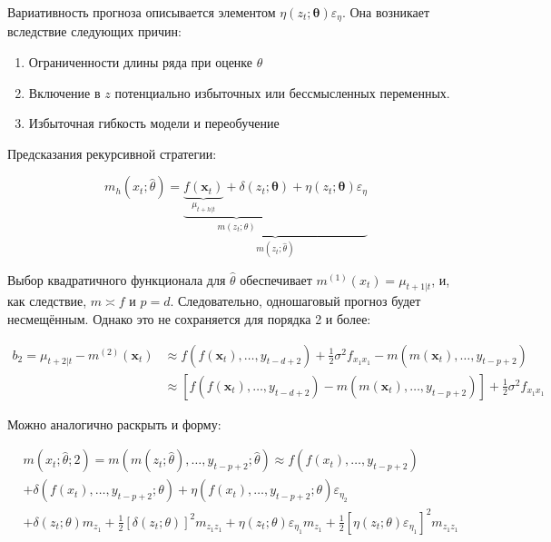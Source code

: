 \documentclass[a4paper,12pt]{article}
\begin{document}
Вариативность прогноза описывается элементом $\eta\left(z_{t} ; \boldsymbol{\theta}\right) \varepsilon_{\eta}$. Она возникает вследствие следующих причин:

\begin{enumerate}[\Sun]
	\item Ограниченности длины ряда при оценке $ \theta $
	
	\item Включение в $ z $ потенциально избыточных или бессмысленных переменных.
	
	\item  Избыточная гибкость модели и переобучение
\end{enumerate}


Предсказания рекурсивной стратегии:
	
	\[
	m_h\left(x_{t} ; \hat{\theta}\right) =\underbrace{\underbrace{\underbrace{f\left(\boldsymbol{x}_{t}\right)}_{\mu_{t+h | t}}+\delta\left(z_{t} ; \boldsymbol{\theta}\right)}_{m\left(z_{t} ; \theta \right)}+\eta\left(z_{t} ; \boldsymbol{\theta}\right) \varepsilon_{\eta}}_{m\left(z_{t} ; \hat{\theta}\right)}
	\]
	


 
 Выбор квадратичного функционала для $ \hat{\theta} $ обеспечивает $m^{(1)}\left(x_{t}\right)=\mu_{t+1 | t}$, и, как следствие, $ m \asymp f $ и $ p = d $. Следовательно, одношаговый прогноз будет несмещённым. Однако это не сохраняется для порядка 2 и более:
 
 \[
 \begin{aligned} b_{2}=\mu_{t+2 | t}-m^{(2)}\left(\boldsymbol{x}_{t}\right) & \approx f\left(f\left(\boldsymbol{x}_{t}\right), \ldots, y_{t-d+2}\right)+\frac{1}{2} \sigma^{2} f_{x_{1} x_{1}}-m\left(m\left(\boldsymbol{x}_{t}\right), \ldots, y_{t-p+2}\right) \\ & \approx\left[f\left(f\left(\boldsymbol{x}_{t}\right), \ldots, y_{t-d+2}\right)-m\left(m\left(\boldsymbol{x}_{t}\right), \ldots, y_{t-p+2}\right)\right]+\frac{1}{2} \sigma^{2} f_{x_{1} x_{1}} \end{aligned}
 \]
 
 Можно аналогично раскрыть и форму:
 
 \[\begin{aligned} & m\left(x_{t} ; \hat{\theta} ; 2\right) =  m\left(m\left(z_{t} ; \hat{\theta}\right), \ldots, y_{t-p+2} ; \hat{\theta}\right) \approx f\left(f\left(x_{t}\right), \ldots, y_{t-p+2}\right) \\ &+\delta\left(f\left(x_{t}\right), \ldots, y_{t-p+2} ; \theta\right) +\eta\left(f\left(x_{t}\right), \ldots, y_{t-p+2} ; \theta\right) \varepsilon_{\eta_{2}} \\ &+\delta\left(z_{t} ; \theta\right) m_{z_{1}}+\frac{1}{2}\left[\delta\left(z_{t} ; \theta\right)\right]^{2} m_{z_{1} z_{1}} +\eta\left(z_{t} ; \theta\right) \varepsilon_{\eta_{1}} m_{z_{1}}+\frac{1}{2}\left[\eta\left(z_{t} ; \theta\right) \varepsilon_{\eta_{1}}\right]^{2} m_{z_{1} z_{1}} \end{aligned}
 \]
 
\end{document}
